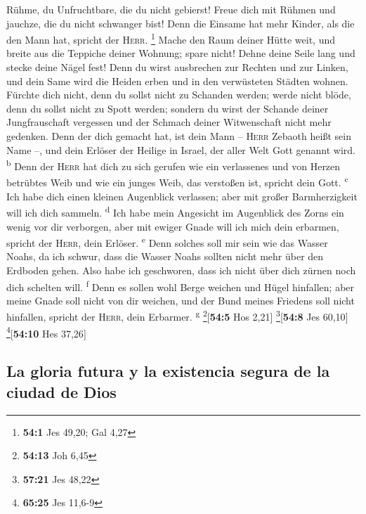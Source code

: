  Rühme, du Unfruchtbare, die du nicht gebierst! Freue dich
mit Rühmen und jauchze, die du nicht schwanger bist! Denn die Einsame
hat mehr Kinder, als die den Mann hat, spricht der \textsc{Herr}.
\footnote{\textbf{54:1} Jes 49,20; Gal 4,27}  Mache den
Raum deiner Hütte weit, und breite aus die Teppiche deiner Wohnung;
spare nicht! Dehne deine Seile lang und stecke deine Nägel fest!
 Denn du wirst ausbrechen zur Rechten und zur Linken, und
dein Same wird die Heiden erben und in den verwüsteten Städten wohnen.
 Fürchte dich nicht, denn du sollst nicht zu Schanden
werden; werde nicht blöde, denn du sollst nicht zu Spott werden; sondern
du wirst der Schande deiner Jungfrauschaft vergessen und der Schmach
deiner Witwenschaft nicht mehr gedenken.  Denn der dich
gemacht hat, ist dein Mann -- \textsc{Herr} Zebaoth heißt sein Name --,
und dein Erlöser der Heilige in Israel, der aller Welt Gott genannt
wird. \textsuperscript{b}  Denn der \textsc{Herr} hat dich
zu sich gerufen wie ein verlassenes und von Herzen betrübtes Weib und
wie ein junges Weib, das verstoßen ist, spricht dein Gott.
\textsuperscript{c}  Ich habe dich einen kleinen
Augenblick verlassen; aber mit großer Barmherzigkeit will ich dich
sammeln. \textsuperscript{d}  Ich habe mein Angesicht im
Augenblick des Zorns ein wenig vor dir verborgen, aber mit ewiger Gnade
will ich mich dein erbarmen, spricht der \textsc{Herr}, dein Erlöser.
\textsuperscript{e}  Denn solches soll mir sein wie das
Wasser Noahs, da ich schwur, dass die Wasser Noahs sollten nicht mehr
über den Erdboden gehen. Also habe ich geschworen, dass ich nicht über
dich zürnen noch dich schelten will. \textsuperscript{f} 
Denn es sollen wohl Berge weichen und Hügel hinfallen; aber meine Gnade
soll nicht von dir weichen, und der Bund meines Friedens soll nicht
hinfallen, spricht der \textsc{Herr}, dein Erbarmer. \textsuperscript{g}
\footnote{\textbf{54:13} Joh 6,45}{[}\textbf{54:5} Hos 2,21{]}
\footnote{\textbf{57:21} Jes 48,22}{[}\textbf{54:8} Jes 60,10{]}
\footnote{\textbf{65:25} Jes 11,6-9}{[}\textbf{54:10} Hes 37,26{]}

\hypertarget{la-gloria-futura-y-la-existencia-segura-de-la-ciudad-de-dios}{%
\subsection{La gloria futura y la existencia segura de la ciudad de
Dios}\label{la-gloria-futura-y-la-existencia-segura-de-la-ciudad-de-dios}}

